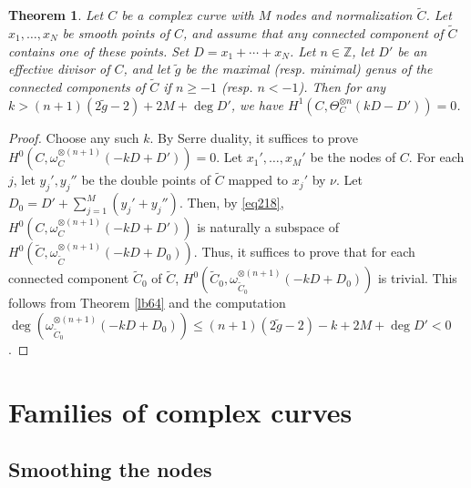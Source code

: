 \documentclass[12pt,b5paper,notitlepage]{report}
\theoremstyle{definition}
\theoremstyle{plain}
\newtheorem{thm}[df]{Theorem}
\newcommand{\wtd}{\widetilde}
\newcommand{\Zbb}{\mathbb Z}
\numberwithin{equation}{section}
\begin{document}
\begin{thm}\label{lb10}
Let $C$ be a complex curve with $M$ nodes and normalization $\wtd C$. Let $x_1,\dots,x_N$ be smooth points of $C$, and assume that any connected component of $\wtd C$ contains one of these points. Set $D=x_1+\cdots+x_N$. Let $n\in\Zbb$, let $D'$ be an effective divisor of $C$,  and let $\wtd g$ be the maximal (resp. minimal) genus of the connected components of $\wtd C$ if $n\geq -1$ (resp. $n<-1$). Then for any $k>(n+1)(2\wtd g-2)+2M+\deg D'$, we have $H^1(C,\Theta_C^{\otimes n}(kD-D'))=0$.
\end{thm}


\begin{proof}
Choose any such $k$. By Serre duality, it suffices to prove $H^0(C,\omega_C^{\otimes(n+1)}(-kD+D'))=0$. Let $x_1',\dots,x_M'$ be the nodes of $C$. For each $j$, let $y_j',y_j''$ be the double points of $\wtd C$ mapped to $x_j'$ by $\nu$. Let $D_0=D'+\sum_{j=1}^M(y_j'+y_j'')$. Then, by \eqref{eq218}, $H^0(C,\omega_C^{\otimes(n+1)}(-kD+D'))$ is naturally a subspace of $H^0(\wtd C,\omega_{\wtd C}^{\otimes(n+1)}(-kD+D_0))$. Thus, it suffices to prove that for each connected component $\wtd C_0$ of $\wtd C$,  $H^0(\wtd C_0,\omega_{\wtd C_0}^{\otimes(n+1)}(-kD+D_0))$ is trivial. This follows from Theorem \ref{lb64} and the computation $\deg(\omega_{\wtd C_0}^{\otimes(n+1)}(-kD+D_0))\leq (n+1)(2\wtd g-2)-k+2M+\deg D'<0$. 
\end{proof}






\section{Families of complex curves}\label{lb24}

\subsection*{Smoothing the nodes}
\end{document}
